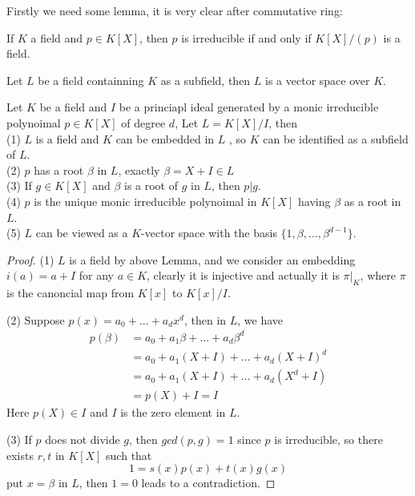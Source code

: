 \documentclass[en,geye,blue,normal,12pt]{elegantnote}
\begin{document}
Firstly we need some lemma, it is very clear after commutative ring:
\begin{lemma} \label{irr iff field}
  If \(K\) a field and \(p \in K[X]\), then \(p\) is irreducible if and only if \(K[X]/(p)\) is a field.
\end{lemma}

\begin{lemma}
  Let \(L\) be a field containning \(K\) as a subfield, then \(L\) is a vector space over \(K\).
\end{lemma}

\begin{proposition}
  Let \(K\) be a field and \(I\) be a princiapl ideal generated by a monic irreducible polynoimal \(p \in K[X]\) of degree \(d\), Let \(L = K[X]/I\), then\\
  (1) \(L\) is a field and \(K\) can be embedded in \(L\) , so \(K\) can be identified as a subfield of \(L\).
  \\
  (2) \(p\) has a root \(\beta\) in \(L\), exactly \(\beta = X + I \in L\) \\
  (3) If \(g \in K[X]\) and \(\beta\) is a root of \(g\) in  \(L\), then \(p|g\).\\
  (4) \(p\) is the unique monic irreducible polynoimal in \(K[X]\) having \(\beta\) as a root in \(L\).\\
  (5) \(L\) can be viewed as a \(K\)-vector space with the basis \(\{1,\beta,...,\beta^{d-1}\}\).

  \begin{proof}
    (1) \(L\) is a field by above Lemma, and we consider an embedding \(i(a) = a+I\) for any \(a \in K\), clearly it is injective and actually it is \(\pi|_K\), where \(\pi\) is the canoncial map from \(K[x]\) to \(K[x]/I\).

    (2) Suppose \(p(x) = a_0+...+a_dx^d \), then in \(L\), we have
    \begin{align*}
      p(\beta) & = a_0+a_1\beta+...+a_d\beta^d \\
      &= a_0+a_1(X+I)+...+a_d(X+I)^d \\
      &= a_0+a_1(X+I)+...+a_d(X^d+I) \\
      &= p(X)+I=I
    \end{align*}
    Here \(p(X) \in I\) and \(I\) is the zero element in \(L\).

    (3) If \(p\) does not divide \(g\), then \(gcd(p,g) = 1\) since \(p\) is irreducible, so there exists \(r, t\) in \(K[X]\) such that
    \[1 = s(x)p(x)+t(x)g(x)\]
    put \(x=\beta\) in \(L\), then \(1 = 0\) leads to a contradiction.


\end{proof}
\end{proposition}
\end{document}
